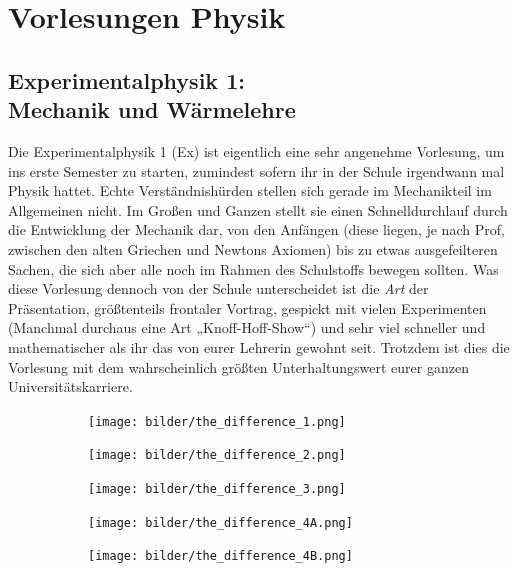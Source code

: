 \section{Vorlesungen Physik}

\subsection{Experimentalphysik 1: \\Mechanik und Wärmelehre}
\label{ex1}
Die Experimentalphysik 1 (\gls{Ex}) ist eigentlich eine sehr angenehme Vorlesung, um ins erste Semester zu starten, zumindest sofern ihr in der Schule irgendwann mal Physik hattet. Echte Verständnishürden stellen sich gerade im Mechanikteil im Allgemeinen nicht. Im Großen und Ganzen stellt sie einen Schnelldurchlauf durch die Entwicklung der Mechanik dar, von den Anfängen (diese liegen, je nach Prof, zwischen den alten Griechen und Newtons Axiomen) bis zu etwas ausgefeilteren Sachen, die sich aber alle noch im Rahmen des Schulstoffs bewegen sollten. Was diese Vorlesung dennoch von der Schule unterscheidet ist die \emph{Art} der Präsentation, größtenteils frontaler Vortrag, gespickt mit vielen Experimenten (Manchmal durchaus eine Art „Knoff-Hoff-Show“) und sehr viel schneller und mathematischer als ihr das von eurer Lehrerin gewohnt seit. Trotzdem ist dies die Vorlesung mit dem wahrscheinlich größten Unterhaltungswert eurer ganzen Universitätskarriere.

\begin{figure}[b]
    \centering
    \begin{subfigure}[b]{.18\textwidth}
    \texttt{[image: bilder/the\_difference\_1.png]}	    
    \end{subfigure}
    \begin{subfigure}[b]{.18\textwidth}
    \texttt{[image: bilder/the\_difference\_2.png]}
    \end{subfigure}
    \begin{subfigure}[b]{.18\textwidth}
    \texttt{[image: bilder/the\_difference\_3.png]}
    \end{subfigure}
    \begin{subfigure}[b]{.18\textwidth}
    \texttt{[image: bilder/the\_difference\_4A.png]}
    \end{subfigure}
    \begin{subfigure}[b]{.18\textwidth}
    \texttt{[image: bilder/the\_difference\_4B.png]}
    \end{subfigure}
\end{figure}

